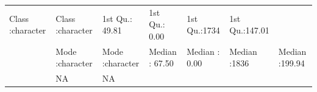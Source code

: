 \documentclass[]{article}
\begin{document}
\begin{longtable}[]{@{}lllllll@{}}
\begin{minipage}[t]{0.14\columnwidth}
Class :character\strut
\end{minipage} & \begin{minipage}[t]{0.14\columnwidth}\raggedright\strut
Class :character\strut
\end{minipage} & \begin{minipage}[t]{0.13\columnwidth}\raggedright\strut
1st Qu.: 49.81\strut
\end{minipage} & \begin{minipage}[t]{0.13\columnwidth}\raggedright\strut
1st Qu.: 0.00\strut
\end{minipage} & \begin{minipage}[t]{0.11\columnwidth}\raggedright\strut
1st Qu.:1734\strut
\end{minipage} & \begin{minipage}[t]{0.13\columnwidth}\raggedright\strut
1st Qu.:147.01\strut
\end{minipage}\tabularnewline
\begin{minipage}[t]{0.03\columnwidth}\raggedright\strut
\strut
\end{minipage} & \begin{minipage}[t]{0.14\columnwidth}\raggedright\strut
Mode :character\strut
\end{minipage} & \begin{minipage}[t]{0.14\columnwidth}\raggedright\strut
Mode :character\strut
\end{minipage} & \begin{minipage}[t]{0.13\columnwidth}\raggedright\strut
Median : 67.50\strut
\end{minipage} & \begin{minipage}[t]{0.13\columnwidth}\raggedright\strut
Median : 0.00\strut
\end{minipage} & \begin{minipage}[t]{0.11\columnwidth}\raggedright\strut
Median :1836\strut
\end{minipage} & \begin{minipage}[t]{0.13\columnwidth}\raggedright\strut
Median :199.94\strut
\end{minipage}\tabularnewline
\begin{minipage}[t]{0.03\columnwidth}\raggedright\strut
\strut
\end{minipage} & \begin{minipage}[t]{0.14\columnwidth}\raggedright\strut
NA\strut
\end{minipage} & \begin{minipage}[t]{0.14\columnwidth}\raggedright\strut
NA\strut

\end{minipage}
\end{longtable}
\end{document}
